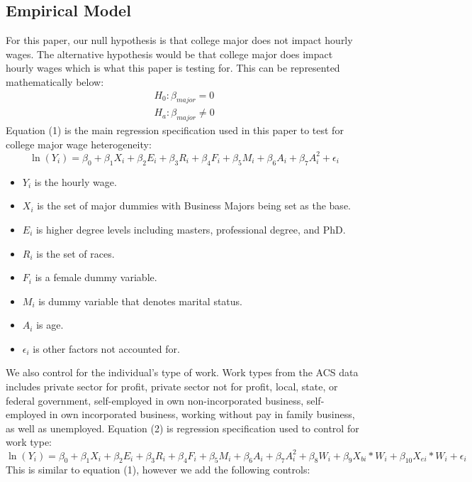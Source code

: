 \documentclass[12pt]{article}
\begin{document}
\subsection{Empirical Model}
\par For this paper, our null hypothesis is that college major does not impact hourly wages. The alternative hypothesis would be that college major does impact hourly wages which is what this paper is testing for. This can be represented mathematically below:
\begin{align*}
H_0: \beta_{major} = 0 \\
H_a: \beta_{major} \neq 0
\end{align*}
Equation (1) is the main regression specification used in this paper to test for college major wage heterogeneity:
\begin{equation}
\ln(Y_i) = \beta_0 + \beta_1 X_i + \beta_2 E_i + \beta_3 R_i + \beta_4 F_i + \beta_5 M_i + \beta_6A_i + \beta_7A_i^2 + \epsilon_i
\end{equation}
\begin{itemize}
\item $Y_i$ is the hourly wage.
\item $X_i$ is the set of major dummies with Business Majors being set as the base.
\item $E_i$ is higher degree levels including masters, professional degree, and PhD.
\item $R_i$ is the set of races.
\item $F_i$ is a female dummy variable.
\item $M_i$ is dummy variable that denotes marital status.
\item $A_i$ is age.
\item $\epsilon_i$ is other factors not accounted for.
\end{itemize} 
We also control for the individual's type of work. Work types from the ACS data includes private sector for profit, private sector not for profit, local, state, or federal government, self-employed in own non-incorporated business, self-employed in own incorporated business, working without pay in family business, as well as unemployed. Equation (2) is regression specification used to control for work type:
\begin{equation}
\ln(Y_i) = \beta_0 + \beta_1 X_i + \beta_2 E_i + \beta_3 R_i + \beta_4 F_i + \beta_5 M_i + \beta_6A_i + \beta_7A_i^2 + \beta_8W_i + \beta_9X_{bi}*W_i + \beta_{10}X_{ei}*W_i + \epsilon_i
\end{equation}
This is similar to equation (1), however we add the following controls:
\end{document}
